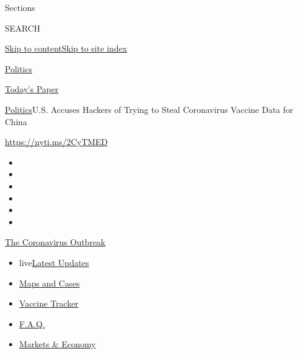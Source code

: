 Sections

SEARCH

\protect\hyperlink{site-content}{Skip to
content}\protect\hyperlink{site-index}{Skip to site index}

\href{https://www.nytimes.com/section/politics}{Politics}

\href{https://myaccount.nytimes.com/auth/login?response_type=cookie\&client_id=vi}{}

\href{https://www.nytimes.com/section/todayspaper}{Today's Paper}

\href{/section/politics}{Politics}\textbar{}U.S. Accuses Hackers of
Trying to Steal Coronavirus Vaccine Data for China

\href{https://nyti.ms/2CyTMED}{https://nyti.ms/2CyTMED}

\begin{itemize}
\item
\item
\item
\item
\item
\item
\end{itemize}

\href{https://www.nytimes.com/news-event/coronavirus?action=click\&pgtype=Article\&state=default\&region=TOP_BANNER\&context=storylines_menu}{The
Coronavirus Outbreak}

\begin{itemize}
\tightlist
\item
  live\href{https://www.nytimes.com/2020/08/08/world/coronavirus-updates.html?action=click\&pgtype=Article\&state=default\&region=TOP_BANNER\&context=storylines_menu}{Latest
  Updates}
\item
  \href{https://www.nytimes.com/interactive/2020/us/coronavirus-us-cases.html?action=click\&pgtype=Article\&state=default\&region=TOP_BANNER\&context=storylines_menu}{Maps
  and Cases}
\item
  \href{https://www.nytimes.com/interactive/2020/science/coronavirus-vaccine-tracker.html?action=click\&pgtype=Article\&state=default\&region=TOP_BANNER\&context=storylines_menu}{Vaccine
  Tracker}
\item
  \href{https://www.nytimes.com/interactive/2020/world/coronavirus-tips-advice.html?action=click\&pgtype=Article\&state=default\&region=TOP_BANNER\&context=storylines_menu}{F.A.Q.}
\item
  \href{https://www.nytimes.com/live/2020/08/07/business/stock-market-today-coronavirus?action=click\&pgtype=Article\&state=default\&region=TOP_BANNER\&context=storylines_menu}{Markets
  \& Economy}
\end{itemize}

